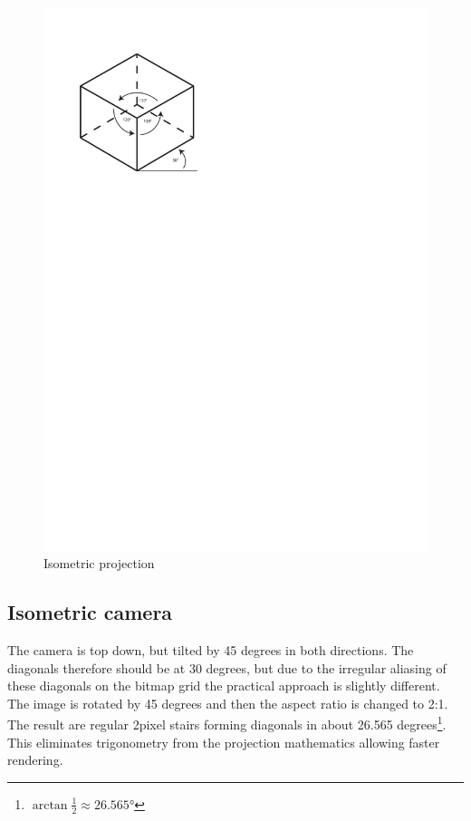 \documentclass[11pt,oneside, final]{fithesis2}
\begin{document}
\begin{figure}[htp]
	\centering
	\includegraphics[clip=true,trim=0 205mm 100mm 0]{thesis-isobox}
	\caption{Isometric projection}
	\label{isometric}
\end{figure}

\subsection{Isometric camera}
The camera is top down, but tilted by 45 degrees in both directions. The diagonals therefore should be at 30 degrees, but due to the irregular aliasing of these diagonals on the bitmap grid the practical approach is slightly different. The image is rotated by 45 degrees and then the aspect ratio is changed to 2:1. The result are regular 2pixel stairs forming diagonals in about 26.565 degrees\footnote{\begin{math}\arctan \frac{1}{2} \approx 26.565\si{\degree}\end{math}}. This eliminates trigonometry from the projection mathematics allowing faster rendering.
\end{document}
